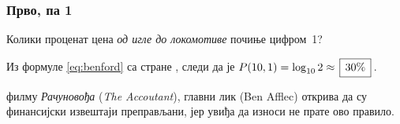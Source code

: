 \subsubsection{Прво, па 1}\label{sssec:benford}

\zadatak  
Колики проценат цена {\sl од игле до локомотиве\/} почиње цифром~1?

\resenje 
Из формуле \eqref{eq:benford} са стране \pageref{eq:benford}, следи да је 
$P(10,1)=\logten 2 \approx \ram{30\%}$.

\dodatak 
\У филму {\sl Рачуновођа\/} ({\sl The Accoutant\/}), главни лик (Ben Afflec) открива
да су финансијски извештаји преправљани, јер увиђа да износи
не прате ово правило.
